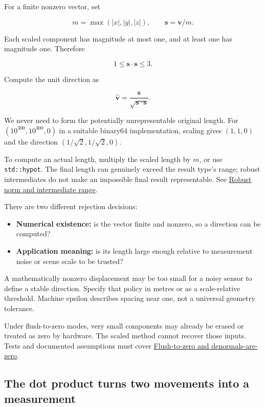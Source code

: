 For a finite nonzero vector, set

\[
m=\max(|x|,|y|,|z|),\qquad
\mathbf s=\mathbf v/m.
\]

Each scaled component has magnitude at most one, and at least one has magnitude one. Therefore

\[
1\le\mathbf s\cdot\mathbf s\le3.
\]

Compute the unit direction as

\[
\widehat{\mathbf v}=\frac{\mathbf s}{\sqrt{\mathbf s\cdot\mathbf s}}.
\]

We never need to form the potentially unrepresentable original length. For \((10^{300},10^{300},0)\) in a suitable binary64 implementation, scaling gives \((1,1,0)\) and the direction \((1/\sqrt2,1/\sqrt2,0)\).

To compute an actual length, multiply the scaled length by \(m\), or use \texttt{std::hypot}. The final length can genuinely exceed the result type's range; robust intermediates do not make an impossible final result representable. See \hyperref[appendix-7f1e17dcafb1]{Robust norm and intermediate range}.

There are two different rejection decisions:

\begin{itemize}
\tightlist
\item
  \textbf{Numerical existence:} is the vector finite and nonzero, so a direction can be computed?
\item
  \textbf{Application meaning:} is its length large enough relative to measurement noise or scene scale to be trusted?
\end{itemize}

A mathematically nonzero displacement may be too small for a noisy sensor to define a stable direction. Specify that policy in metres or as a scale-relative threshold. Machine epsilon describes spacing near one, not a universal geometry tolerance.

Under flush-to-zero modes, very small components may already be erased or treated as zero by hardware. The scaled method cannot recover those inputs. Tests and documented assumptions must cover \hyperref[appendix-e979eb012782]{Flush-to-zero and denormals-are-zero}.

\subsection{The dot product turns two movements into a measurement}\label{the-dot-product-turns-two-movements-into-a-measurement}

